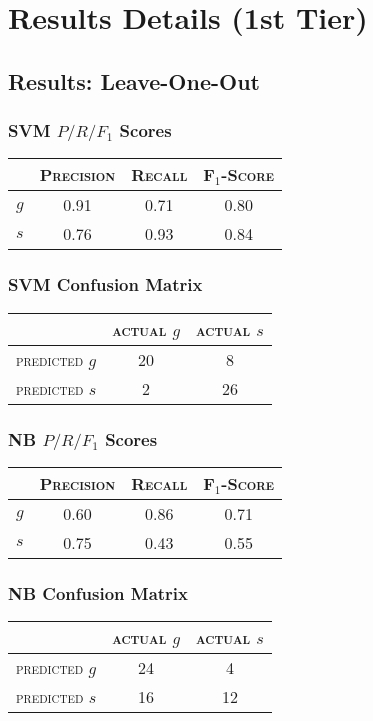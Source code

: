 \chapter{Results Details (1st Tier)}
\label{resultsdetails}
\begin{multicols}{2}
\section{Results: Leave-One-Out}
\subsection{SVM $P/R/F_1$ Scores}
\begin{tabular}{ c | c  c  c }
	& \textsc{Precision} & \textsc{Recall} & \textsc{F$_1$-Score} \\
	\hline
	\textsc{$g$} 	& 0.91 & 0.71 & 0.80 \\
	\textsc{$s$}	& 0.76 & 0.93 & 0.84
\end{tabular}
\subsection{SVM Confusion Matrix}
\begin{tabular}{ c | c  c }
	 & \textsc{actual $g$} & \textsc{actual $s$} \\
	\hline
	\textsc{predicted $g$} 	& 20 & 8 \\
	\textsc{predicted $s$}		& 2 & 26
\end{tabular}

\subsection{NB $P/R/F_1$ Scores}
\begin{tabular}{ c | c  c  c }
	& \textsc{Precision} & \textsc{Recall} & \textsc{F$_1$-Score} \\
	\hline
	\textsc{$g$} 	& 0.60 & 0.86 & 0.71 \\
	\textsc{$s$}	& 0.75 & 0.43 & 0.55
\end{tabular}
\subsection{NB Confusion Matrix}
\begin{tabular}{ c | c  c }
	 & \textsc{actual $g$} & \textsc{actual $s$} \\
	\hline
	\textsc{predicted $g$} 	& 24 & 4 \\
	\textsc{predicted $s$}		& 16 & 12
\end{tabular}


\end{multicols}
